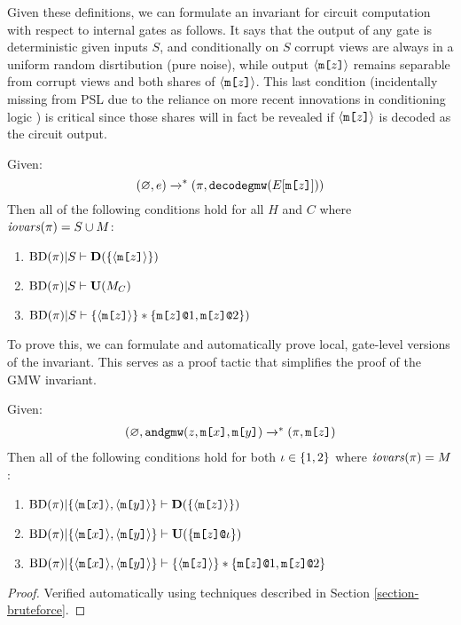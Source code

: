 Given these definitions, we can formulate an invariant for circuit
computation with respect to internal gates as follows. It says that
the output of any gate is deterministic given inputs $S$, and
conditionally on $S$ corrupt views are always in a uniform random
disrtibution (pure noise), while output $\langle \texttt{m[}z\texttt{]} \rangle$ remains
separable from corrupt views and both shares of
$\langle \texttt{m[}z\texttt{]} \rangle$. This last condition (incidentally missing from PSL
due to the reliance on more recent innovations in conditioning logic
\cite{li2023lilac}) is critical since those shares will in fact be
revealed if $\langle \texttt{m[}z\texttt{]} \rangle$ is decoded as the circuit output.
\begin{lemma}
  \label{lemma-gmwinvariant}
  Given:
  $$ (\varnothing,e) \xrightarrow{}^{*} (\pi,\texttt{decodegmw}(E[\texttt{m[}z\texttt{]}])) $$
  Then all of the following conditions hold for all $H$ and $C$ where $\mathit{iovars}(\pi) = S \cup M$:
  \begin{enumerate}
  \item $\mathrm{BD}(\pi)|S \vdash \mathbf{D}(\{\langle \texttt{m[}z\texttt{]} \rangle\})$
  \item $\mathrm{BD}(\pi)|S \vdash \mathbf{U}(M_C)$
  \item $\mathrm{BD}(\pi)|S \vdash \{\langle \texttt{m[}z\texttt{]} \rangle\} * \{ \texttt{m[}z\texttt{]}\texttt{@}1, \texttt{m[}z\texttt{]}\texttt{@}2 \})$
  \end{enumerate}
\end{lemma}
To prove this, we can formulate and automatically prove local,
gate-level versions of the invariant. This serves as a proof tactic
that simplifies the proof of the GMW invariant. 
\begin{lemma}
  \label{lemma-gmwtactic}
  Given:
  $$
  \begin{array}{c}
  (\varnothing,\andgmw(z,\mesg{x},\mesg{y}) \redxs %
  (\prog,\mesg{z})
  \end{array}
  $$
  Then all of the following conditions hold for both $\iota \in \{ 1,2 \}$ where $\mathit{iovars}(\pi) = M$:
  \begin{enumerate}
  \item
    $\mathrm{BD}(\pi)|\{ \langle \texttt{m[}x\texttt{]} \rangle,\langle \texttt{m[}y\texttt{]} \rangle \} \vdash \mathbf{D}(\{ \langle \texttt{m[}z\texttt{]} \rangle \})$
  \item $\mathrm{BD}(\pi)|\{ \langle \texttt{m[}x\texttt{]} \rangle,\langle \texttt{m[}y\texttt{]} \rangle \} \vdash \mathbf{U}(\{ \texttt{m[}z\texttt{]}\texttt{@}\iota \})$
  \item $\mathrm{BD}(\pi)|\{ \langle \texttt{m[}x\texttt{]} \rangle,\langle \texttt{m[}y\texttt{]} \rangle \} \vdash \{ \langle \texttt{m[}z\texttt{]} \rangle \} * \{ \texttt{m[}z\texttt{]}\texttt{@}1,\texttt{m[}z\texttt{]}\texttt{@}2 \}$
  \end{enumerate}
\end{lemma}
\begin{proof}
Verified automatically using techniques described in Section \ref{section-bruteforce}.  
\end{proof}

